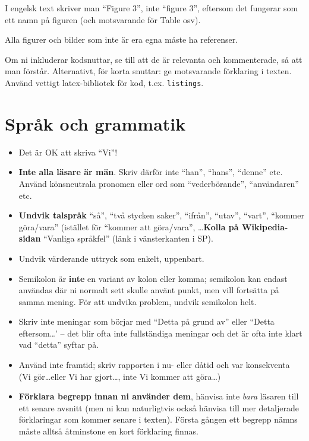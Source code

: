 \documentclass[swedish, a4paper,12pt]{article}
\begin{document}
I engelsk text skriver man ``Figure 3'', inte ``figure 3'', eftersom det fungerar som ett namn på figuren (och motsvarande för Table osv).

Alla figurer och bilder som inte är era egna måste ha referenser.

Om ni inkluderar kodsnuttar, se till att de är relevanta och kommenterade, så att man förstår.  Alternativt, för korta snuttar: ge motsvarande förklaring i texten.
Använd vettigt latex-bibliotek för kod, t.ex. \texttt{listings}.

\section{Språk och grammatik}
\label{sec:sprak-och-grammatik}

\begin{itemize}
\item    Det är OK att skriva ``Vi''!

\item    \textbf{Inte alla läsare är män}.  Skriv därför inte ``han'', ``hans'', ``denne'' etc.  Använd könsneutrala pronomen eller ord som ``vederbörande'', ``användaren'' etc.

\item    \textbf{Undvik talspråk} ``så'', ``två stycken saker'', ``ifrån'', ``utav'', ``vart'', ``kommer göra/vara'' (istället för ``kommer att göra/vara'', \ldots \textbf{Kolla på Wikipedia-sidan} ``Vanliga språkfel'' (länk i vänsterkanten i SP).

\item    Undvik värderande uttryck som enkelt, uppenbart.

\item    Semikolon är \textbf{inte} en variant av kolon eller komma; semikolon kan endast användas där ni normalt sett skulle använt punkt, men vill fortsätta på samma mening. För att undvika problem, undvik semikolon helt.

\item    Skriv inte meningar som börjar med ``Detta på grund av'' eller ``Detta eftersom\ldots' -- det blir ofta inte fullständiga meningar och det är ofta inte klart vad ``detta'' syftar på.

\item    Använd inte framtid; skriv rapporten i nu- eller dåtid och var konsekventa (Vi gör\ldots eller Vi har gjort\ldots, inte Vi kommer att göra\ldots)

\item    \textbf{Förklara begrepp innan ni använder dem}, hänvisa inte \emph{bara} läsaren till ett senare avsnitt (men ni kan naturligtvis också hänvisa till mer detaljerade förklaringar som kommer senare i texten).  Första gången ett begrepp nämns måste alltså åtminstone en kort förklaring finnas.


\end{itemize}
\end{document}
